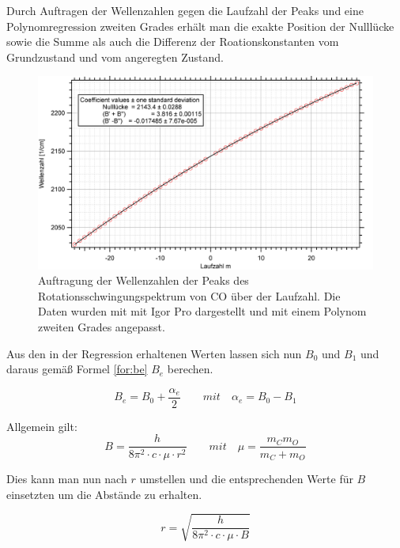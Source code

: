 \begin{table}[H]
\begin{tabular}{C{0.15\linewidth}|C{0.15\linewidth}|C{0.15\linewidth}}
	
	\end{tabular}
\end{table}

Durch Auftragen der Wellenzahlen gegen die Laufzahl der Peaks und eine Polynomregression zweiten Grades erhält man die exakte Position der Nulllücke sowie die Summe als auch die Differenz der Roationskonstanten vom Grundzustand und  vom angeregten Zustand.


\begin{figure}[H]
	\centering	
	\begin{minipage}{1\textwidth}
		\includegraphics[width=\columnwidth]{Bilder/Graph_fitm.png}
	\end{minipage}
	\caption{Auftragung der Wellenzahlen der Peaks des Rotationsschwingungspektrum von CO über der Laufzahl. Die Daten wurden mit mit Igor Pro dargestellt und mit einem Polynom zweiten Grades angepasst.}
	\label{fit3}
\end{figure}

Aus den in der  Regression erhaltenen Werten lassen sich nun $B_0$ und $B_1$ und daraus gemäß Formel \ref{for:be} $B_e$ berechen.


\begin{equation}
B_e=B_0+\frac{\alpha_e}{2}\quad\quad \textit{mit}\quad \alpha_e=B_0-B_1
\label{for:be}
\end{equation}

Allgemein gilt: 
\begin{equation}
B=\frac{h}{8\pi^2\cdot c\cdot \mu \cdot r^2}\quad\quad \textit{mit}\quad \mu=\frac{m_Cm_O}{m_C+m_O}
\end{equation}

Dies kann man nun nach $r$ umstellen und die entsprechenden Werte für $B$ einsetzten um die Abstände zu erhalten.

\begin{equation}
r=\sqrt{\frac{h}{8\pi^2\cdot c\cdot \mu \cdot B}}
\end{equation}

